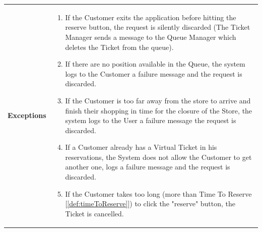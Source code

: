 \documentclass[a4paper, 12pt, oneside]{article}
\begin{document}
\begin{tabularx}{\linewidth}{| l | X |}
    \hline
    \textbf{Exceptions} & \parbox{0.7\textwidth}{ \begin{enumerate}
            \item If the Customer exits the application before hitting the reserve button, the request is silently discarded (The Ticket Manager sends a message to the Queue Manager which deletes the Ticket from the queue).
            \item If there are no position available in the Queue, the system logs to the Customer a failure message and the request is discarded.
            \item If the Customer is too far away from the store to arrive and finish their shopping in time for the closure of the Store, the system logs to the User a failure message the request is discarded.
            \item If a Customer already has a Virtual Ticket in his reservations, the System does not allow the Customer to get another one, logs a failure message and the request is discarded.
            \item If the Customer takes too long (more than Time To Reserve [\ref{def:timeToReserve}]) to click the "reserve" button, the Ticket is cancelled.
        \end{enumerate}}\\

    \hline
    
\end{tabularx}
\end{document}
